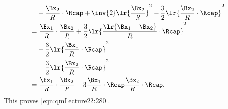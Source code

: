 {\begin{equation}
\begin{aligned}
&\quad - \frac{\Bx_2}{R} \cdot \Rcap +\inv{2} \lr{\frac{\Bx_2}{R}}^2
- \frac{3}{2}
\lr{ \frac{\Bx_2}{R} \cdot \Rcap}^2  \\
&=
\frac{\Bx_1}{R} \cdot \frac{\Bx_2 }{R}
+ \frac{3}{2}
\lr{ \frac{\lr{ \Bx_1 - \Bx_2 }}{R} \cdot \Rcap}^2  \\
&\quad
- \frac{3}{2}
\lr{ \frac{\Bx_1}{R} \cdot \Rcap}^2  \\
&\quad
- \frac{3}{2}
\lr{ \frac{\Bx_2}{R} \cdot \Rcap}^2  \\
&=
\frac{\Bx_1}{R} \cdot \frac{\Bx_2 }{R}
- 3 \frac{\Bx_1}{R} \cdot \Rcap  \frac{\Bx_2}{R} \cdot \Rcap.
\end{aligned}
\end{equation}
%
This proves \cref{eqn:qmLecture22:280}.
} %

